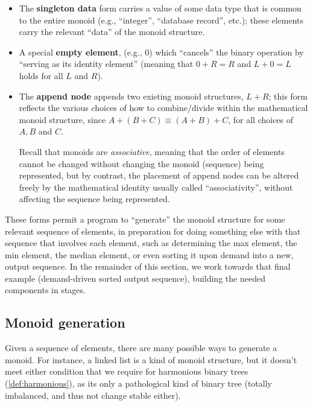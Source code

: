\documentclass[11pt]{article}
\begin{document}
\begin{itemize}

\item The \textbf{singleton data} form carries a value of some data type that is common to the entire monoid (e.g., ``integer'', ``database record'', etc.); these elements carry the relevant ``data'' of the monoid structure.

\item A special \textbf{empty element}, (e.g., $0$) which ``cancels'' the binary operation by ``serving as its identity element'' (meaning that $0 + R = R$ and $L + 0 = L$ holds for all $L$ and $R$).

\item The \textbf{append node} appends two existing monoid structures,  $L + R$; this form reflects the various choices of how to combine/divide within the mathematical monoid structure, since $A + (B + C) \equiv (A + B) + C$, for all choices of $A, B$ and $C$.

  Recall that monoids are \emph{associative}, meaning that the order of elements cannot be changed without changing the monoid (sequence) being represented, but by contrast, the placement of append nodes can be altered freely by the mathematical identity usually called ``associativity'', without affecting the sequence being represented.

\end{itemize}

These forms permit a program to ``generate'' the monoid structure for
some relevant sequence of elements, in preparation for doing something
else with that sequence that involves each element, such as
determining the max element, the min element, the median element, or
even sorting it upon demand into a new, output sequence.
%
In the remainder of this section, we work towards that final example
(demand-driven sorted output sequence), building the needed components
in stages.

\subsection{Monoid generation}

Given a sequence of elements, there are many possible ways to generate a monoid.
%
For instance, a linked list is a kind of monoid structure, but it
doesn't meet either condition that we require for harmonious binary trees (\cref{def:harmonious}), as its
only a pathological kind of binary tree (totally imbalanced, and thus
not change stable either).
\end{document}
